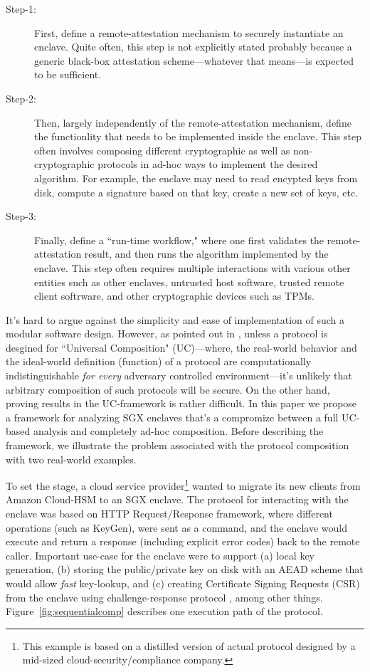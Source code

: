 \documentclass[10pt]{article}
\newcommand{\uc}{\textsf{UC}}
\begin{document}
  \begin{description}
    \item[Step-1:] First, define a remote-attestation mechanism to
      securely instantiate an enclave. Quite often, this step is not
      explicitly stated probably because a generic black-box
      attestation scheme---whatever that means---is expected to be
      sufficient.
    \item[Step-2:] Then, largely independently of the
      remote-attestation mechanism, define the functionlity that needs
      to be implemented inside the enclave. This step often involves
      composing different cryptographic as well as non-cryptographic
      protocols in ad-hoc ways to implement the desired algorithm. For
      example, the enclave may need to read encypted keys from disk,
      compute a signature based on that key, create a new set of keys,
      etc.
    \item[Step-3:] Finally, define a ``run-time workflow," where one
      first validates the remote-attestation result, and then runs the
      algorithm implemented by the enclave. This step often requires
      multiple interactions with various other entities such as other
      enclaves, untrusted host software, trusted remote client
      softrware, and other cryptographic devices such as TPMs.
  \end{description}

  It's hard to argue against the simplicity and ease of implementation
  of such a modular software design. However, as pointed out in
  \cite{ucframework}, unless a protocol is desgined for
  ``\textsf{Universal Composition}" (\uc)---where, the real-world
  behavior and the ideal-world definition (function) of a protocol are
  computationally indistinguishable \textit{for every} adversary
  controlled environment---it's unlikely that arbitrary composition of
  such protocols will be secure. On the other hand, proving results in
  the \uc-framework is rather difficult. In this paper we propose a
  framework for analyzing SGX enclaves that's a compromize between a
  full \uc-based analysis and completely ad-hoc composition. Before
  describing the framework, we illustrate the problem associated with
  the protocol composition with two real-world examples.

  To set the stage, a cloud service provider\footnote{This example is
    based on a distilled version of actual protocol designed by a
    mid-sized cloud-security/compliance company.} wanted to migrate
  its new clients from Amazon Cloud-HSM to an SGX enclave. The
  protocol for interacting with the enclave was based on HTTP
  Request/Response framework, where different operations (such as
  \textsf{KeyGen}), were sent as a command, and the enclave would
  execute and return a response (including explicit error codes) back
  to the remote caller.  Important use-case for the enclave were to
  support (a) local key generation, (b) storing the public/private key
  on disk with an AEAD scheme that would allow \textit{fast}
  key-lookup, and (c) creating Certificate Signing Requests (CSR) from
  the enclave using challenge-response protocol
  \cite[\S5.2.8.3]{rfc4210}, among other
  things. Figure~\ref{fig:sequentialcomp} describes one execution path
  of the protocol.
\end{document}
